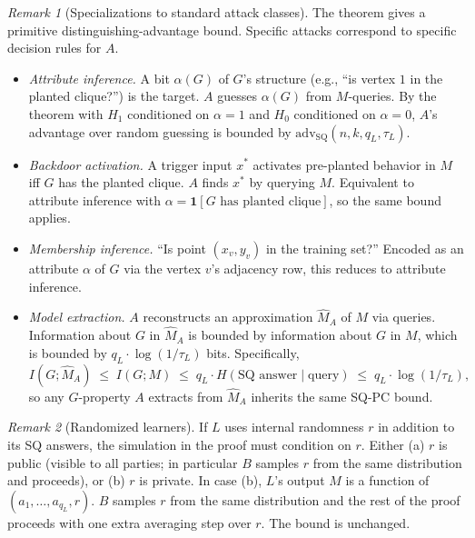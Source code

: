 \documentclass[11pt,a4paper]{article}
\theoremstyle{definition}
\theoremstyle{remark}
\newtheorem*{remark}{Remark}
\newcommand{\Adv}{\mathrm{adv}}
\newcommand{\AdvSQ}{\Adv_{\mathrm{SQ}}}
\begin{document}
\begin{remark}[Specializations to standard attack classes]
The theorem gives a primitive distinguishing-advantage bound. Specific attacks correspond to specific decision rules for $A$.
\begin{itemize}
  \item \emph{Attribute inference.} A bit $\alpha(G)$ of $G$'s structure (e.g., ``is vertex $1$ in the planted clique?'') is the target. $A$ guesses $\alpha(G)$ from $M$-queries. By the theorem with $H_1$ conditioned on $\alpha = 1$ and $H_0$ conditioned on $\alpha = 0$, $A$'s advantage over random guessing is bounded by $\AdvSQ(n, k, q_L, \tau_L)$.
  \item \emph{Backdoor activation.} A trigger input $x^*$ activates pre-planted behavior in $M$ iff $G$ has the planted clique. $A$ finds $x^*$ by querying $M$. Equivalent to attribute inference with $\alpha = \mathbf{1}[G \text{ has planted clique}]$, so the same bound applies.
  \item \emph{Membership inference.} ``Is point $(x_v, y_v)$ in the training set?'' Encoded as an attribute $\alpha$ of $G$ via the vertex $v$'s adjacency row, this reduces to attribute inference.
  \item \emph{Model extraction.} $A$ reconstructs an approximation $\widehat{M}_A$ of $M$ via queries. Information about $G$ in $\widehat{M}_A$ is bounded by information about $G$ in $M$, which is bounded by $q_L \cdot \log(1/\tau_L)$ bits. Specifically,
  \[
  I(G; \widehat{M}_A) \;\le\; I(G; M) \;\le\; q_L \cdot H(\text{SQ answer} \mid \text{query}) \;\le\; q_L \cdot \log(1/\tau_L),
  \]
  so any $G$-property $A$ extracts from $\widehat{M}_A$ inherits the same SQ-PC bound.
\end{itemize}
\end{remark}

\begin{remark}[Randomized learners]\label{rem:randomized}
If $L$ uses internal randomness $r$ in addition to its SQ answers, the simulation in the proof must condition on $r$. Either (a) $r$ is public (visible to all parties; in particular $B$ samples $r$ from the same distribution and proceeds), or (b) $r$ is private. In case (b), $L$'s output $M$ is a function of $(a_1, \ldots, a_{q_L}, r)$. $B$ samples $r$ from the same distribution and the rest of the proof proceeds with one extra averaging step over $r$. The bound is unchanged.
\end{remark}
\end{document}
